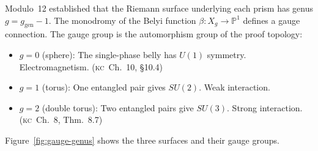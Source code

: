 \documentclass[11pt, a4paper, openany]{book}
\newcommand{\KC}[1]{\textnormal{(\textsc{kc}~#1)}}
\newcounter{thm}[chapter]
\begin{document}
\noindent
Modulo~12 established that the Riemann surface underlying each prism has genus $g = g_{\mathrm{gen}} - 1$. The monodromy of the Belyi function $\beta : X_g \to \mathbb{P}^1$ defines a gauge connection. The gauge group is the automorphism group of the proof topology:

\begin{theorem}\label{thm:gauge-groups}
\begin{itemize}
  \item $g = 0$ (sphere): The single-phase belly has $U(1)$ symmetry. Electromagnetism. \KC{Ch.~10, \S10.4}
  \item $g = 1$ (torus): One entangled pair gives $SU(2)$. Weak interaction.
  \item $g = 2$ (double torus): Two entangled pairs give $SU(3)$. Strong interaction. \KC{Ch.~8, Thm.~8.7}
\end{itemize}
\end{theorem}

\noindent
Figure~\ref{fig:gauge-genus} shows the three surfaces and their gauge
groups.
\end{document}
